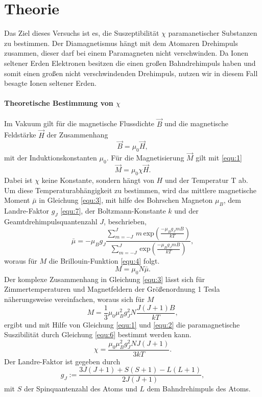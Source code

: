 \section{Theorie}
\label{sec:Theorie}
Das Ziel dieses Versuchs ist es, die Suszeptibilität $\chi$ paramanetischer Substanzen zu bestimmen.
Der Diamagnetismus hängt mit dem Atomaren Drehimpuls zusammen, dieser darf bei einem Paramagneten nicht verschwinden. 
Da Ionen seltener Erden Elektronen besitzen die einen großen Bahndrehimpuls haben und somit einen großen nicht verschwindenden 
Drehimpuls, nutzen wir in diesem Fall besagte Ionen seltener Erden.

\paragraph{Theoretische Bestimmung von $\chi$}
Im Vakuum gilt für die magnetische Flussdichte $\vec{B}$ und die magnetische Feldstärke $\vec{H}$ der Zusammenhang 
\begin{equation}
    \label{equ:1}
    \vec{B} = \mu_0 \vec{H},
\end{equation}
mit der Induktionskonstanten $\mu_0$.
Für die Magnetisierung $\vec{M}$ gilt mit \eqref{equ:1}
\begin{equation}
    \label{equ:2}
    \vec{M} = \mu_0 \chi \vec{H}.
\end{equation}
Dabei ist $\chi$ keine Konstante, sondern hängt von $H$ und der Temperatur T ab.
Um diese Temperaturabhängigkeit zu bestimmen, wird das mittlere magnetische Moment $\bar{\mu}$ in Gleichung \eqref{equ:3},
mit hilfe des Bohrschen Magneton $\mu_B$, dem Landre-Faktor $g_J$ \eqref{equ:7}, der Boltzmann-Konstante $k$ und der Geamtdrehimpulsquantenzahl $J$,
beschrieben,
\begin{equation}
    \label{equ:3}
    \bar{\mu} = - \mu_B g_J \frac{\sum_{m = -J}^{J}\, m\, \text{exp}\left( \frac{-\mu_B g_J mB}{k T}\right)} {\sum_{m = -J}^{J}\, \text{exp}\left( \frac{-\mu_B g_J mB}{k T}\right)},
\end{equation}
woraus für $M$ die Brillouin-Funktion \eqref{equ:4} folgt.
\begin{equation}
    \label{equ:4}
    M = \mu_0 N \bar{\mu}.
\end{equation}
Der komplexe Zusammenhang in Gleichung \eqref{equ:3} lässt sich für Zimmertemperaturen und Magnetfeldern der Größenordnung 1 Tesla 
näherungsweise vereinfachen, woraus sich für $M$ 
\begin{equation}
    \label{equ:5}
    M = \frac{1}{3} \mu_0 \mu_B^2 g_J^2 N \frac{J(J + 1) B}{k T},
\end{equation}
ergibt und mit Hilfe von Gleichung \eqref{equ:1} und \eqref{equ:2} die paramagnetische Suszibilität durch Gleichung \eqref{equ:6} bestimmt werden kann.
\begin{equation}
    \label{equ:6}
    \chi = \frac{\mu_0 \mu_B^2 g_J^2 N J (J + 1)}{3 k T}.
\end{equation}
Der Landre-Faktor ist gegeben durch 
\begin{equation}
    \label{equ:7}
    g_J := \frac{3 J(J + 1) + {S(S+1) - L(L+1)}}{2 J(J+1)},
\end{equation}
mit $S$ der Spinquantenzahl des Atoms und  $L$ dem Bahndrehimpuls des Atoms.

